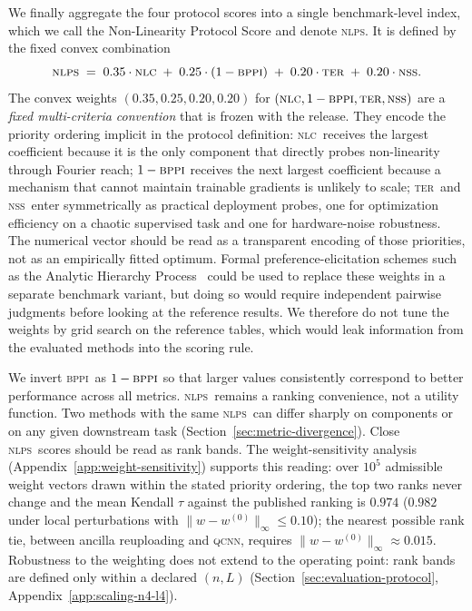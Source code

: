 \documentclass{article}
\newcommand{\nlc}{\textsc{nlc}}
\newcommand{\bppi}{\textsc{bppi}}
\newcommand{\nss}{\textsc{nss}}
\newcommand{\ter}{\textsc{ter}}
\newcommand{\nlps}{\textsc{nlps}}
\begin{document}
We finally aggregate the four protocol scores into a single benchmark-level index, which we call the Non-Linearity Protocol Score and denote \nlps.
It is defined by the fixed convex combination
\begin{equation}
    \nlps
    \;=\;
    0.35 \cdot \nlc
    \;+\;
    0.25 \cdot (1 - \bppi)
    \;+\;
    0.20 \cdot \ter
    \;+\;
    0.20 \cdot \nss.
    \label{eq:nlps-formula}
\end{equation}
The convex weights $(0.35, 0.25, 0.20, 0.20)$ for $(\nlc, 1-\bppi, \ter, \nss)$ are a \emph{fixed multi-criteria convention} that is frozen with the release.
They encode the priority ordering implicit in the protocol definition: \nlc\ receives the largest coefficient because it is the only component that directly probes non-linearity through Fourier reach; $1-\bppi$ receives the next largest coefficient because a mechanism that cannot maintain trainable gradients is unlikely to scale; \ter\ and \nss\ enter symmetrically as practical deployment probes, one for optimization efficiency on a chaotic supervised task and one for hardware-noise robustness.
The numerical vector should be read as a transparent encoding of those priorities, not as an empirically fitted optimum.
Formal preference-elicitation schemes such as the Analytic Hierarchy Process~\citep{saaty1987ahp} could be used to replace these weights in a separate benchmark variant, but doing so would require independent pairwise judgments before looking at the reference results.
We therefore do not tune the weights by grid search on the reference tables, which would leak information from the evaluated methods into the scoring rule.

We invert \bppi\ as $1-\bppi$ so that larger values consistently correspond to better performance across all metrics. \nlps\ remains a ranking convenience, not a utility function. Two methods with the same \nlps\ can differ sharply on components or on any given downstream task (Section~\ref{sec:metric-divergence}).
Close \nlps\ scores should be read as rank bands.
The weight-sensitivity analysis (Appendix~\ref{app:weight-sensitivity}) supports this reading: over $10^5$ admissible weight vectors drawn within the stated priority ordering, the top two ranks never change and the mean Kendall $\tau$ against the published ranking is $0.974$ ($0.982$ under local perturbations with $\|w-w^{(0)}\|_\infty \le 0.10$); the nearest possible rank tie, between ancilla reuploading and \textsc{qcnn}, requires $\|w-w^{(0)}\|_\infty \approx 0.015$.
Robustness to the weighting does not extend to the operating point: rank bands are defined only within a declared $(n,L)$ (Section~\ref{sec:evaluation-protocol}, Appendix~\ref{app:scaling-n4-l4}).
\end{document}
